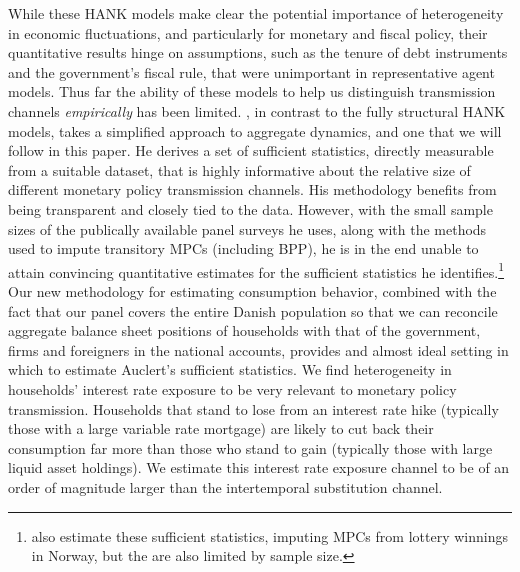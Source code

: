 \documentclass[titlepage]{\econtex}\newcommand{\texname}{ConsumptionHeterogeneity}
\begin{document}
While these HANK models make clear the potential importance of heterogeneity in economic fluctuations, and particularly for monetary and fiscal policy, their quantitative results hinge on assumptions, such as the tenure of debt instruments and the government's fiscal rule, that were unimportant in representative agent models. Thus far the ability of these models to help us distinguish transmission channels \textit{empirically} has been limited. \cite{auclert_monetary_2017}, in contrast to the fully structural HANK models, takes a simplified approach to aggregate dynamics, and one that we will follow in this paper. He derives a set of sufficient statistics, directly measurable from a suitable dataset, that is highly informative about the  relative size of different monetary policy transmission channels. His methodology benefits from being transparent and closely tied to the data. However, with the small sample sizes of the publically available panel surveys he uses, along with the methods used to impute transitory MPCs (including BPP), he is in the end unable to attain convincing quantitative estimates for the sufficient statistics he identifies.\footnote{\cite{fagereng_mpc_2016} also estimate these sufficient statistics, imputing MPCs from lottery winnings in Norway, but the are also limited by sample size.} Our new methodology for estimating consumption behavior, combined with the fact that our panel covers the entire Danish population so that we can reconcile aggregate balance sheet positions of households with that of the government, firms and foreigners in the national accounts, provides and almost ideal setting in which to estimate Auclert's sufficient statistics. We find heterogeneity in households' interest rate exposure to be very relevant to monetary policy transmission. Households that stand to lose from an interest rate hike (typically those with a large variable rate mortgage) are likely to cut back their consumption far more than those who stand to gain (typically those with large liquid asset holdings). We estimate this interest rate exposure channel to be of an order of magnitude larger than the intertemporal substitution channel.
\end{document}

